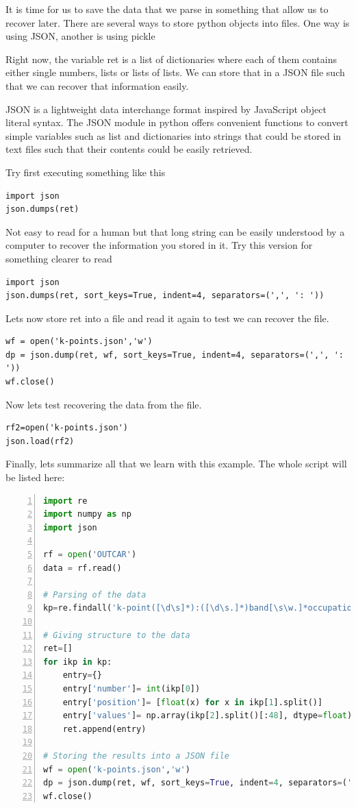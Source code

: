 It is time for us to save the data that we parse in something that allow us to recover later. There are several ways to store python objects into files. One way is using JSON, another is using pickle

Right now, the variable ret is a list of dictionaries where each of them contains either single numbers, lists or lists of lists. We can store that in a JSON file such that we can recover that information easily.

JSON is a lightweight data interchange format inspired by JavaScript object literal syntax.
The JSON module in python offers convenient functions to convert simple variables such as list and dictionaries into strings that could be stored in text files such that their contents could be easily retrieved.

Try first executing something like this

\begin{lstlisting}
import json
json.dumps(ret)
\end{lstlisting}

Not easy to read for a human but that long string can be easily understood by a computer to recover the information you stored in it. Try this version for something clearer to read

\begin{lstlisting}
import json
json.dumps(ret, sort_keys=True, indent=4, separators=(',', ': '))
\end{lstlisting}

Lets now store ret into a file and read it again to test we can recover the file.

\begin{lstlisting}
wf = open('k-points.json','w')
dp = json.dump(ret, wf, sort_keys=True, indent=4, separators=(',', ': '))
wf.close()
\end{lstlisting}

Now lets test recovering the data from the file.

\begin{lstlisting}
rf2=open('k-points.json')
json.load(rf2)
\end{lstlisting}

Finally, lets summarize all that we learn with this example.
The whole script will be listed here:

\begin{lstlisting}[language=Python, numbers=left]
import re
import numpy as np
import json

rf = open('OUTCAR')
data = rf.read()

# Parsing of the data
kp=re.findall('k-point([\d\s]*):([\d\s.]*)band[\s\w.]*occupation([\s\d:.\-]*)\n\n', data)

# Giving structure to the data
ret=[]
for ikp in kp:
    entry={}
    entry['number']= int(ikp[0])
    entry['position']= [float(x) for x in ikp[1].split()]
    entry['values']= np.array(ikp[2].split()[:48], dtype=float).reshape(-1,3).tolist()
    ret.append(entry)

# Storing the results into a JSON file
wf = open('k-points.json','w')
dp = json.dump(ret, wf, sort_keys=True, indent=4, separators=(',', ': '))
wf.close()
\end{lstlisting}

